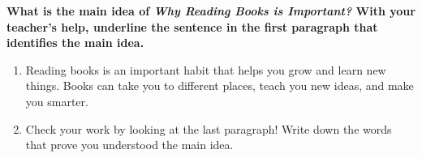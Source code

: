 \documentclass[12pt]{article}
\begin{document}
\begin{tcolorbox}[colframe=black!60, colback=white, 
coltitle=black, colbacktitle=black!15, fonttitle=\bfseries\Large, 
title=Guided Practice, halign title=center, left=10pt, right=10pt, top=10pt, bottom=15pt]
\textbf{What is the main idea of \textit{Why Reading Books is Important?} With your teacher's help, underline the sentence in the first paragraph that identifies the main idea.} 
\vspace{1cm}
\begin{enumerate}[itemsep=4em] %
    \item Reading books is an important habit that helps you grow and learn new things. Books can take you to different places, teach you new ideas, and make you smarter. 
    \item Check your work by looking at the last paragraph! Write down the words that prove you understood the main idea.
\\[0.8cm] \underline{\hspace{15cm}}  
    \\[0.8cm] \underline{\hspace{15cm}}  
    \\[0.8cm] \underline{\hspace{15cm}}  
\end{enumerate}

\end{tcolorbox}

\vspace{1em}
\end{document}
